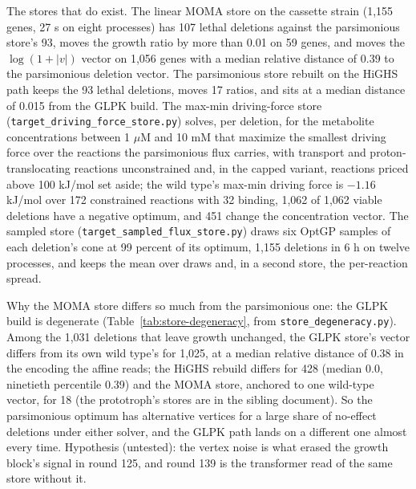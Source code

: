 The stores that do exist. The linear MOMA store on the cassette strain (1,155 genes,
27 s on eight processes) has 107 lethal deletions against the parsimonious store's 93,
moves the growth ratio by more than 0.01 on 59 genes, and moves the $\log(1+|v|)$ vector
on 1,056 genes with a median relative distance of 0.39 to the parsimonious deletion
vector. The parsimonious store rebuilt on the HiGHS path keeps the 93 lethal deletions,
moves 17 ratios, and sits at a median distance of 0.015 from the GLPK build. The
max-min driving-force store (\texttt{target\_driving\_force\_store.py}) solves, per
deletion, for the metabolite concentrations between 1 $\mu$M and 10 mM that maximize the
smallest driving force over the reactions the parsimonious flux carries, with transport
and proton-translocating reactions unconstrained and, in the capped variant, reactions
priced above 100 kJ/mol set aside; the wild type's max-min driving force is $-1.16$
kJ/mol over 172 constrained reactions with 32 binding, 1,062 of 1,062 viable deletions
have a negative optimum, and 451 change the concentration vector. The sampled store
(\texttt{target\_sampled\_flux\_store.py}) draws six OptGP samples of each deletion's
cone at 99 percent of its optimum, 1,155 deletions in 6 h on twelve processes, and keeps
the mean over draws and, in a second store, the per-reaction spread.

Why the MOMA store differs so much from the parsimonious one: the GLPK build is
degenerate (Table~\ref{tab:store-degeneracy}, from
\texttt{store\_degeneracy.py}). Among the 1,031 deletions that leave growth unchanged,
the GLPK store's vector differs from its own wild type's for 1,025, at a median relative
distance of 0.38 in the encoding the affine reads; the HiGHS rebuild differs for 428
(median 0.0, ninetieth percentile 0.39)
and the MOMA store, anchored to one wild-type vector, for 18 (the prototroph's stores
are in the sibling document). So the parsimonious
optimum has alternative vertices for a large share of no-effect deletions under either
solver, and the GLPK path lands on a different one almost every time. Hypothesis
(untested): the vertex noise is what erased the growth block's signal in round 125, and
round 139 is the transformer read of the same store without it.


